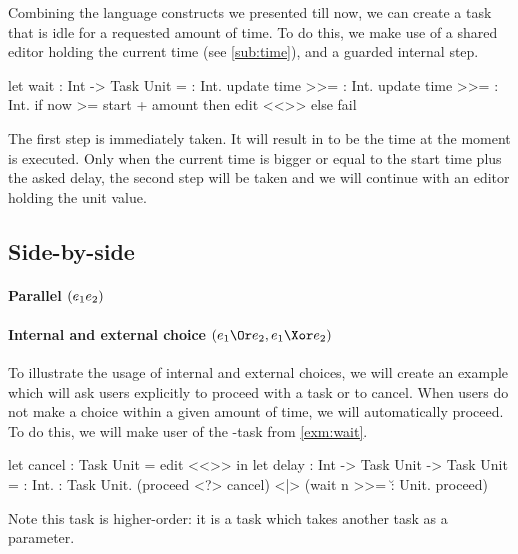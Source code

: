 \begin{example}[Wait]\label{exm:wait}

Combining the language constructs we presented till now,
we can create a task that is idle for a requested amount of time.
To do this,
we make use of a shared editor holding the current time (see \autoref{sub:time}),
and a guarded internal step.
\begin{TASK}
  let wait : Int -> Task Unit = \amount : Int.
    update time >>= \start : Int.
    update time >>= \now : Int.
      if now >= start + amount then edit <<>> else fail
\end{TASK}
The first step is immediately taken.
It will result in  to be the time at the moment  is executed.
Only when the current time  is bigger or equal to the start time plus the asked delay,
the second step will be taken and we will continue with an editor holding the unit value.

\end{example}



\subsection{Side-by-side}



\paragraph{Parallel $(e_1 \relax e_2)$}




\paragraph{Internal and external choice $(e_1 \Or e_2, e_1 \Xor e_2)$}


\begin{example}[Delay]


To illustrate the usage of internal and external choices,
we will create an example which will ask users explicitly to proceed with a task or to cancel.
When users do not make a choice within a given amount of time,
we will automatically proceed.
To do this,
we will make user of the -task from \autoref{exm:wait}.
\begin{TASK}
  let cancel : Task Unit = edit <<>> in
  let delay : Int -> Task Unit -> Task Unit =
    \n : Int. \proceed : Task Unit.
    (proceed <?> cancel) <|> (wait n >>= \u : Unit. proceed)
\end{TASK}
Note this task is higher-order:
it is a task which takes another task as a parameter.

\end{example}



